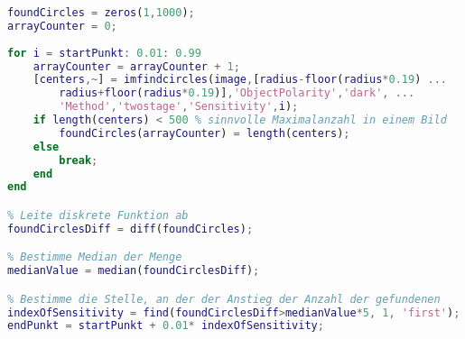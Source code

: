 \begin{lstlisting}[language=MATLAB, caption=Berechnung des Endwertes, label=lst:endwertSuche]
foundCircles = zeros(1,1000);
arrayCounter = 0;
	
for i = startPunkt: 0.01: 0.99
	arrayCounter = arrayCounter + 1;
	[centers,~] = imfindcircles(image,[radius-floor(radius*0.19) ...
		radius+floor(radius*0.19)],'ObjectPolarity','dark', ...
		'Method','twostage','Sensitivity',i);
	if length(centers) < 500 % sinnvolle Maximalanzahl in einem Bild
		foundCircles(arrayCounter) = length(centers);
	else
		break;
	end
end

% Leite diskrete Funktion ab
foundCirclesDiff = diff(foundCircles);

% Bestimme Median der Menge
medianValue = median(foundCirclesDiff);

% Bestimme die Stelle, an der der Anstieg der Anzahl der gefundenen 
indexOfSensitivity = find(foundCirclesDiff>medianValue*5, 1, 'first');
endPunkt = startPunkt + 0.01* indexOfSensitivity;
\end{lstlisting}